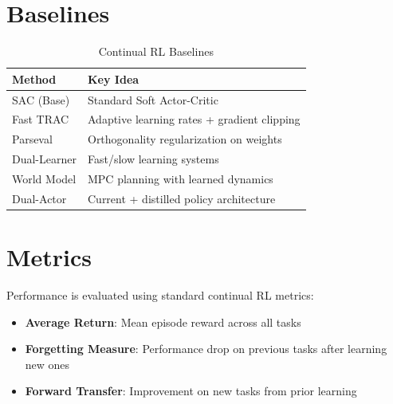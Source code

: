 \documentclass{article}
\begin{document}
\section{Baselines}

\begin{table}[h]
\centering
\caption{Continual RL Baselines}
\begin{tabular}{ll}
\toprule
Method & Key Idea \\
\midrule
SAC (Base) & Standard Soft Actor-Critic \\
Fast TRAC & Adaptive learning rates + gradient clipping \\
Parseval & Orthogonality regularization on weights \\
Dual-Learner & Fast/slow learning systems \\
World Model & MPC planning with learned dynamics \\
Dual-Actor & Current + distilled policy architecture \\
\bottomrule
\end{tabular}
\end{table}

\section{Metrics}

Performance is evaluated using standard continual RL metrics:
\begin{itemize}
    \item \textbf{Average Return}: Mean episode reward across all tasks
    \item \textbf{Forgetting Measure}: Performance drop on previous tasks after learning new ones
    \item \textbf{Forward Transfer}: Improvement on new tasks from prior learning
\end{itemize}
\end{document}
